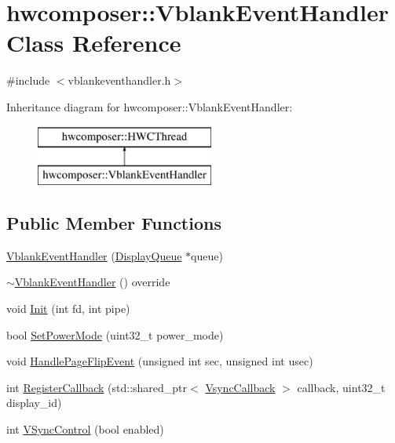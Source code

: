 \hypertarget{classhwcomposer_1_1VblankEventHandler}{}\section{hwcomposer\+:\+:Vblank\+Event\+Handler Class Reference}
\label{classhwcomposer_1_1VblankEventHandler}


{\ttfamily \#include $<$vblankeventhandler.\+h$>$}

Inheritance diagram for hwcomposer\+:\+:Vblank\+Event\+Handler\+:\begin{figure}[H]
\begin{center}
\leavevmode
\includegraphics[height=2.000000cm]{classhwcomposer_1_1VblankEventHandler}
\end{center}
\end{figure}
\subsection*{Public Member Functions}
\begin{DoxyCompactItemize}
\item 
\mbox{\hyperlink{classhwcomposer_1_1VblankEventHandler_ae031bcb80ff6c29fa63ec7725e94016c}{Vblank\+Event\+Handler}} (\mbox{\hyperlink{classhwcomposer_1_1DisplayQueue}{Display\+Queue}} $\ast$queue)
\item 
\mbox{\hyperlink{classhwcomposer_1_1VblankEventHandler_a91f3c1d49fc5ac2466443644ea1665de}{$\sim$\+Vblank\+Event\+Handler}} () override
\item 
void \mbox{\hyperlink{classhwcomposer_1_1VblankEventHandler_ae186f138dd2b0c6592a21cddcc03b93c}{Init}} (int fd, int pipe)
\item 
bool \mbox{\hyperlink{classhwcomposer_1_1VblankEventHandler_a2769f0e90686719ecbe4b83b5e9adc47}{Set\+Power\+Mode}} (uint32\+\_\+t power\+\_\+mode)
\item 
void \mbox{\hyperlink{classhwcomposer_1_1VblankEventHandler_adbea6da7e9e140aa0dd152961bddf833}{Handle\+Page\+Flip\+Event}} (unsigned int sec, unsigned int usec)
\item 
int \mbox{\hyperlink{classhwcomposer_1_1VblankEventHandler_acf3baa44d30a2b6ab5661924c6723497}{Register\+Callback}} (std\+::shared\+\_\+ptr$<$ \mbox{\hyperlink{classhwcomposer_1_1VsyncCallback}{Vsync\+Callback}} $>$ callback, uint32\+\_\+t display\+\_\+id)
\item 
int \mbox{\hyperlink{classhwcomposer_1_1VblankEventHandler_a7d583d082a627dd7ae79daa8b9a2f230}{V\+Sync\+Control}} (bool enabled)
\end{DoxyCompactItemize}

